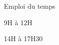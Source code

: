 \begin{frame}{Emploi du temps}
  \centering
  \begin{description}[<+->]
    \item[Matin] 9H à 12H
    \item[Après-midi] 14H à 17H30
  \end{description}
\end{frame}
